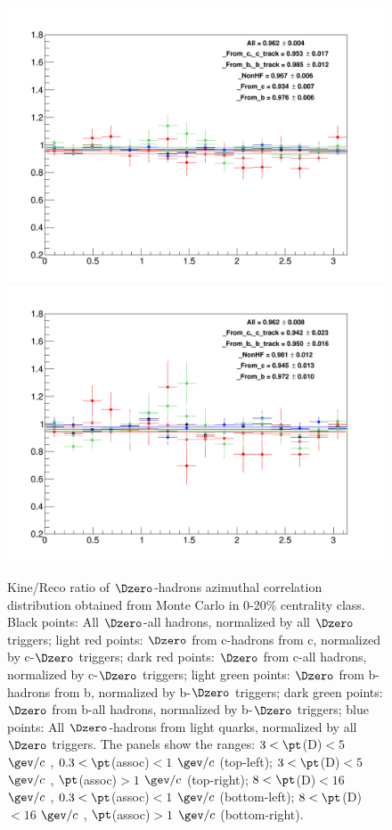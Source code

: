 \begin{figure}
{\includegraphics[width=.48\linewidth]{figuresVsCent/Global/MCClosure/020/MCClosure_Dzero_Canvas_PtIntBins12to12_PoolInt_thr03to99.png}}
{\includegraphics[width=.48\linewidth]{figuresVsCent/Global/MCClosure/020/MCClosure_Dzero_Canvas_PtIntBins12to12_PoolInt_thr1to99.png}}
\caption{Kine/Reco ratio of $\Dzero$-hadrons azimuthal correlation distribution obtained from Monte Carlo in 0-20$\%$ centrality class. Black points: All $\Dzero$-all hadrons, normalized by all $\Dzero$ triggers; light red points: $\Dzero$ from c-hadrons from c, normalized by c-$\Dzero$ triggers; dark red points: $\Dzero$ from c-all hadrons, normalized by c-$\Dzero$ triggers; light green points: $\Dzero$ from b-hadrons from b, normalized by b-$\Dzero$ triggers; dark green points: $\Dzero$ from b-all hadrons, normalized by b-$\Dzero$ triggers; blue points: All $\Dzero$-hadrons from light quarks, normalized by all $\Dzero$ triggers.
The panels show the ranges: $3 < \pt$(D)$ < 5$ $\gev/c$ , $0.3 < \pt$(assoc)$ < 1$ $\gev/c$  (top-left); $3 < \pt$(D)$ < 5$ $\gev/c$ , $\pt$(assoc)$ > 1$ $\gev/c$  (top-right); $8 < \pt$(D)$ < 16$ $\gev/c$ , $0.3 < \pt$(assoc)$ < 1$ $\gev/c$  (bottom-left); $8 < \pt$(D)$ < 16$ $\gev/c$ , $\pt$(assoc)$ > 1$ $\gev/c$  (bottom-right).}
\label{fig:MC_Kine_020}
\end{figure}

